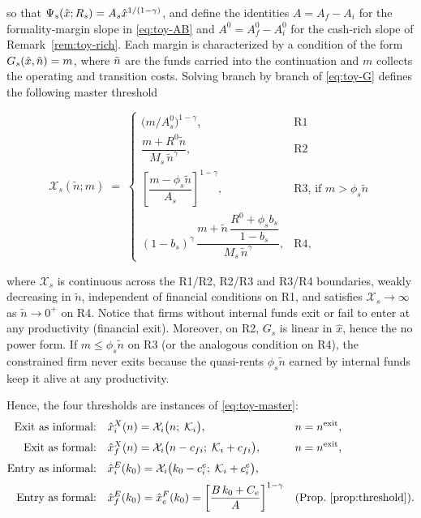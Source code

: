 \documentclass[12pt]{article}
\begin{document}
so that $\Psi_{s}(\hat{x};R_{s})=A_{s}\hat{x}^{1/(1-\gamma)}$, and define the identities $A=A_{f}-A_{i}$ for the formality-margin slope in \eqref{eq:toy-AB} and $A^{0}=A^{0}_{f}-A^{0}_{i}$ for the cash-rich slope of Remark~\ref{rem:toy-rich}. Each margin is characterized by a condition of the form $G_{s}(\hat{x},\tilde{n})=m$, where $\tilde{n}$ are the funds carried into the continuation and $m$ collects the operating and transition costs. Solving branch by branch of \eqref{eq:toy-G} defines the following master threshold

\begin{equation}
  \mathcal{X}_{s}(\tilde n;m)\;=\;
  \begin{cases}
    \big(m/A^{0}_{s}\big)^{1-\gamma},
      & \text{R1}\\[4pt]
    \dfrac{m+R^0\tilde n}{M_{s}\,\tilde n^{\gamma}},
      & \text{R2}\\[8pt]
    \left[\dfrac{m-\phi_{s}\tilde n}{A_{s}}\right]^{1-\gamma},
      & \text{R3, if } m>\phi_{s}\tilde n\\[8pt]
    (1-b_{s})^{\gamma}\,
    \dfrac{m+\tilde n\,\dfrac{R^0+\phi_{s}b_{s}}
    {1-b_{s}}}{M_{s}\,\tilde n^{\gamma}},
      & \text{R4},
  \end{cases}
  \label{eq:toy-master}
\end{equation}

where $\mathcal{X}_{s}$ is continuous across the R1/R2, R2/R3 and R3/R4 boundaries, weakly decreasing in $\tilde n$, independent of financial conditions on R1, and satisfies $\mathcal{X}_{s}\to\infty$ as $\tilde n\to0^{+}$ on R4. Notice that firms without internal funds exit or fail to enter at any productivity (financial exit). Moreover, on R2, $G_{s}$ is linear in $\hat x$, hence the no power form. If $m\leq\phi_{s}\tilde n$ on R3 (or the analogous condition on R4), the constrained firm never exits because the quasi-rents $\phi_ {s}\tilde n$ earned by internal funds keep it alive at any productivity.
 
Hence, the four thresholds are instances of \eqref{eq:toy-master}:
\begin{align}
  \text{Exit as informal:}\quad
  &\hat x^X_{i}(n)=\mathcal{X}_{i}\big(n;\;\mathcal{K}_{i}\big),
  &&n=n^{\text{exit}},
  \label{eq:toy-thXi}\\[2pt]
  \text{Exit as formal:}\quad
  &\hat x^X_{f}(n)=\mathcal{X}_{i}\big(n-c_{fi};\;
    \mathcal{K}_{i}+c_{fi}\big),
  &&n=n^{\text{exit}},
  \label{eq:toy-thXf}\\[2pt]
  \text{Entry as informal:}\quad
  &\hat x^E_{i}(k_{0})=\mathcal{X}_{i}\big(k_{0}-c^e_{i};\;
    \mathcal{K}_{i}+c^e_{i}\big),
  \label{eq:toy-thEi}\\[2pt]
  \text{Entry as formal:}\quad
  &\hat x^E_{f}(k_{0})=\hat x^F_{e}(k_{0})
    =\left[\frac{B\,k_{0}+C_{e}}{A}\right]^{1-\gamma}
  &&\text{(Prop.~\ref{prop:threshold})} .
  \label{eq:toy-thEf}
\end{align}
\end{document}
